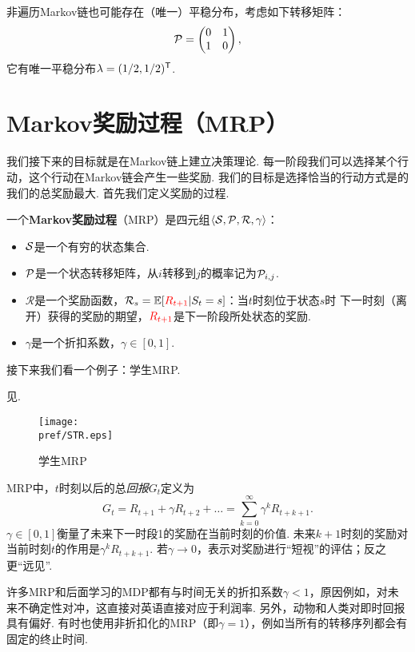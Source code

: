 非遍历Markov链也可能存在（唯一）平稳分布，考虑如下转移矩阵：
\[\P=\begin{pmatrix}0&1\\1&0\end{pmatrix},\]
它有唯一平稳分布$\lambda=(1/2,1/2)^\t$.


\section{Markov奖励过程（MRP）}

我们接下来的目标就是在Markov链上建立决策理论. 每一阶段我们可以选择某个行动，这个行动在Markov链会产生一些奖励. 我们的目标是选择恰当的行动方式是的我们的总奖励最大. 首先我们定义奖励的过程.

\begin{definition}
一个\textbf{Markov奖励过程}（MRP）是四元组$\langle\MS,\P,\mathcal R,\gamma\rangle$：
\begin{itemize}
    \item $\MS$是一个有穷的状态集合.
    \item $\P$是一个状态转移矩阵，从$i$转移到$j$的概率记为$\P_{i,j}$.
    \item $\mathcal R$是一个奖励函数，$\mathcal R_s = \E[\textcolor{red}{R_{t+1}}|S_t=s]$：当$t$时刻位于状态$s$时 下一时刻（离开）获得的奖励的期望，$\textcolor{red}{R_{t+1}}$是下一阶段所处状态的奖励.
    \item $\gamma$是一个折扣系数，$\gamma\in[0,1]$.
\end{itemize}
\end{definition}


接下来我们看一个例子：学生MRP. 
\begin{example}[学生MRP]
见.
\begin{figure}[ht]
    \centering
    \texttt{[image: \\pref/STR.eps]}
    \caption{学生MRP}
    \label{fig:student-MRP}
\end{figure}
\end{example}

 MRP中，$t$时刻以后的总\emph{回报}$G_t$定义为
    \[G_t = R_{t+1}+\gamma R_{t+2} +\dots =\sum_{k=0}^\infty \gamma^kR_{t+k+1}.\]
$\gamma \in[0,1]$衡量了未来下一时段1的奖励在当前时刻的价值. 未来$k+1$时刻的奖励对当前时刻$t$的作用是$\gamma^k R_{t+k+1}$. 若$\gamma\to0$，表示对奖励进行“短视”的评估；反之更“远见”.

许多MRP和后面学习的MDP都有与时间无关的折扣系数$\gamma <1$，原因例如，对未来不确定性对冲，这直接对英语直接对应于利润率. 另外，动物和人类对即时回报具有偏好. 有时也使用非折扣化的MRP（即$\gamma=1$），例如当所有的转移序列都会有固定的终止时间.

